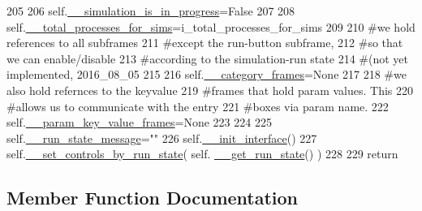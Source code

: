 \begin{DoxyCode}
205 
206         self.\hyperlink{classnegui_1_1pgguisimupop__experimental2_1_1PGGuiSimuPop_a808f09d72837ba776c9d8eec24f726b9}{\_\_simulation\_is\_in\_progress}=\textcolor{keyword}{False}
207 
208         self.\hyperlink{classnegui_1_1pgguisimupop__experimental2_1_1PGGuiSimuPop_abbadb8beda40587fdd8bea8fbda0f8ca}{\_\_total\_processes\_for\_sims}=i\_total\_processes\_for\_sims
209 
210         \textcolor{comment}{#we hold references to all subframes}
211         \textcolor{comment}{#except the run-button subframe,}
212         \textcolor{comment}{#so that we can enable/disable}
213         \textcolor{comment}{#according to the simulation-run state}
214         \textcolor{comment}{#(not yet implemented, 2016\_08\_05}
215 
216         self.\hyperlink{classnegui_1_1pgguisimupop__experimental2_1_1PGGuiSimuPop_a920192dbd0bb3f4bc8a58c9b48757ad0}{\_\_category\_frames}=\textcolor{keywordtype}{None}
217 
218         \textcolor{comment}{#we also hold refernces to the keyvalue}
219         \textcolor{comment}{#frames that hold param values.  This}
220         \textcolor{comment}{#allows us to communicate with the entry}
221         \textcolor{comment}{#boxes via param name.}
222         self.\hyperlink{classnegui_1_1pgguisimupop__experimental2_1_1PGGuiSimuPop_a08bb009e9a24284adfbd8a38dcc0c861}{\_\_param\_key\_value\_frames}=\textcolor{keywordtype}{None}
223 
224 
225         self.\hyperlink{classnegui_1_1pgguisimupop__experimental2_1_1PGGuiSimuPop_a55e3cbea92a9e601f2ac42f49e3774fd}{\_\_run\_state\_message}=\textcolor{stringliteral}{""}
226         self.\hyperlink{classnegui_1_1pgguisimupop__experimental2_1_1PGGuiSimuPop_af6d19d60a59b447ba0eb020360ab9960}{\_\_init\_interface}()
227         self.\hyperlink{classnegui_1_1pgguisimupop__experimental2_1_1PGGuiSimuPop_ad65294a0b1f67c9368d620e6be9a9c15}{\_\_set\_controls\_by\_run\_state}( self.
      \hyperlink{classnegui_1_1pgguisimupop__experimental2_1_1PGGuiSimuPop_afd91d38a61b155fe3cf7084dce1c0984}{\_\_get\_run\_state}() )
228     
229         \textcolor{keywordflow}{return}
\end{DoxyCode}


\subsection{Member Function Documentation}
